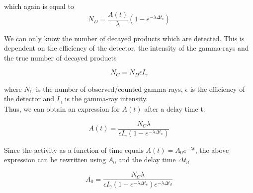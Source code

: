 which again is equal to
\begin{equation}
    N_D = \frac{A(t)}{\lambda} (1-e^{-\lambda \Delta t_c})
\end{equation}

We can only know the number of decayed products which are detected. This is dependent on the efficiency of the detector, the intensity of the gamma-rays and the true number of decayed products

\begin{equation}\label{eq:Ngamma}
    N_C  = N_D \epsilon I_\gamma
\end{equation}

where $N_C$ is the number of observed/counted gamma-rays, $\epsilon$ is the efficiency of the detector and $I_\gamma$ is the gamma-ray intensity.\\ 

\noindent
Thus, we can obtain an expression for $A(t)$ after a delay time t: 

\begin{equation} \label{eq:Final_Expression_A}
    A(t) = \frac{N_C \lambda}{\epsilon I_\gamma (1-e^{-\lambda \Delta t_c})}
\end{equation}

\noindent 
Since the activity as a function of time equals $A(t)=A_0e^{-\lambda t}$, the above expression can be rewritten using $A_0$ and the delay time $\Delta t_d$

\begin{equation} \label{eq:Final_Expression_A0}
    A_0 = \frac{N_C \lambda }{\epsilon I_\gamma (1-e^{-\lambda \Delta t_c})e^{-\lambda \Delta t_d}}
\end{equation}






